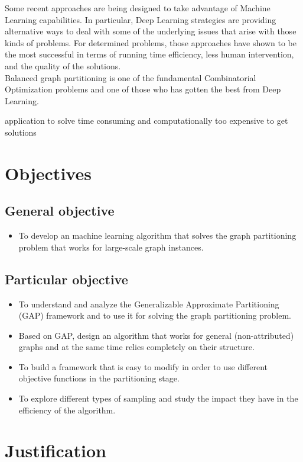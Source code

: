 Some recent approaches are being designed to take advantage of Machine Learning capabilities. In particular, Deep Learning strategies are providing alternative ways to deal with some of the underlying issues that arise with those kinds of problems. For determined problems, those approaches have shown to be the most successful in terms of running time efficiency, less human intervention, and the quality of the solutions. \\

Balanced graph partitioning is one of the fundamental Combinatorial Optimization problems and one of those who has gotten the best from Deep Learning.

application to solve 
time consuming and computationally too expensive to get solutions
 

\section{Objectives}

\subsection{General objective}
\begin{itemize}
    \item To develop an machine learning algorithm that solves the graph partitioning problem that works for large-scale graph instances.
\end{itemize}
\subsection{Particular objective}
\begin{itemize}
    \item To understand and analyze the Generalizable Approximate Partitioning (GAP) framework and to use it for solving the graph partitioning problem.
    \item Based on GAP, design an algorithm that works for general (non-attributed) graphs and at the same time relies completely on their structure.
    \item To build a framework that is easy to modify in order to use different objective functions in the partitioning stage.
    \item To explore different types of sampling and study the impact they have in the efficiency of the algorithm.
\end{itemize}
\section{Justification}

